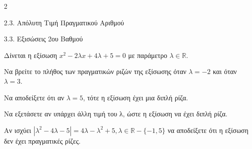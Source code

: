 \begin{ylh}{2}
    \item 2.3. Απόλυτη Τιμή Πραγματικού Αριθμού
    \item 3.3. Εξισώσεις 2ου Βαθμού
\end{ylh}
Δίνεται η εξίσωση $x^2 - 2\lambda x + 4\lambda + 5 = 0$ με παράμετρο $\lambda \in \mathbb{R}$.

\begin{alist}
\item Να βρείτε το πλήθος των πραγματικών ριζών της εξίσωσης όταν $\lambda = -2$ και όταν $\lambda = 3$.
\begin{rlist}
\item Να αποδείξετε ότι αν $\lambda = 5$, τότε η εξίσωση έχει μια διπλή ρίζα.
\item Να εξετάσετε αν υπάρχει άλλη τιμή του λ, ώστε η εξίσωση να έχει διπλή ρίζα.
\end{rlist}
\item Αν ισχύει $|\lambda^2 - 4\lambda - 5| = 4\lambda - \lambda^2 + 5, \lambda \in \mathbb{R} - \{-1, 5\}$ να αποδείξετε ότι η εξίσωση δεν έχει πραγματικές ρίζες.
\end{alist}

